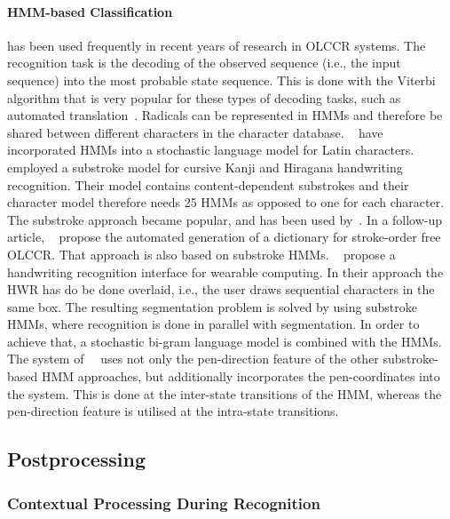 \paragraph{HMM-based Classification} has been used frequently in recent years of
research in OLCCR systems. The recognition task is the decoding of the 
observed sequence (i.e., the input sequence) into the most probable state 
sequence. This is done with the Viterbi algorithm that is very popular for
these types of decoding tasks, such as automated 
translation~. Radicals can be represented in HMMs and 
therefore be shared between different characters in the character database.
~\citeyear{Hu1996} have incorporated HMMs into a 
stochastic language model for Latin characters. 
~\citeyear{Tokuno2002} employed a substroke model for 
cursive Kanji and Hiragana handwriting recognition. Their model contains 
content-dependent substrokes and their character model therefore needs 25 HMMs
as opposed to one for each character. The substroke approach became popular,
and has been used by~. In a follow-up article, 
~\citeyear{Nakai2003} propose the automated generation of a dictionary for 
stroke-order free OLCCR. That approach is also based on substroke HMMs.
~\citeyear{Shimodaira2003} propose a handwriting recognition interface for 
wearable computing. In their approach the HWR has do be done overlaid, i.e., the
user draws sequential characters in the same box. The resulting segmentation
problem is solved by using substroke HMMs, where recognition is done in parallel
with segmentation. In order to achieve that, a stochastic bi-gram language model
is combined with the HMMs.
The system of~~\citeyear{Okumura2005} uses not only the pen-direction feature 
of the other substroke-based HMM approaches, but additionally incorporates the 
pen-coordinates into the system. This is done at the inter-state transitions of 
the HMM, whereas the pen-direction feature is utilised at the intra-state 
transitions.

\subsection{Postprocessing}
\label{sec:olccr:postprocessing}

\subsubsection{Contextual Processing During Recognition}
\label{sec:olccr:contextualprocessingduring}

